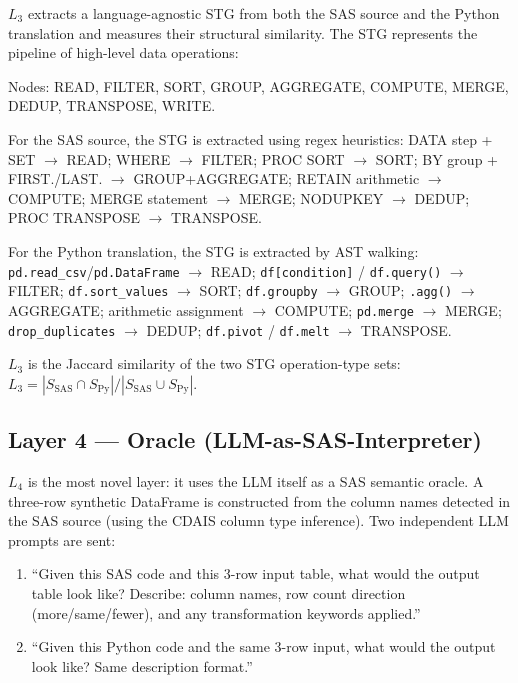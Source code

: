 $L_3$ extracts a language-agnostic \ac{STG} from both the SAS source and the
Python translation and measures their structural similarity. The STG represents
the pipeline of high-level data operations:

Nodes: READ, FILTER, SORT, GROUP, AGGREGATE, COMPUTE, MERGE, DEDUP, TRANSPOSE,
WRITE.

For the SAS source, the STG is extracted using regex heuristics: DATA step +
SET $\rightarrow$ READ; WHERE $\rightarrow$ FILTER; PROC SORT $\rightarrow$ SORT;
BY group + FIRST./LAST. $\rightarrow$ GROUP+AGGREGATE; RETAIN arithmetic
$\rightarrow$ COMPUTE; MERGE statement $\rightarrow$ MERGE;
NODUPKEY $\rightarrow$ DEDUP; PROC TRANSPOSE $\rightarrow$ TRANSPOSE.

For the Python translation, the STG is extracted by AST walking:
\texttt{pd.read\_csv}/\texttt{pd.DataFrame} $\rightarrow$ READ;
\texttt{df[condition]} / \texttt{df.query()} $\rightarrow$ FILTER;
\texttt{df.sort\_values} $\rightarrow$ SORT; \texttt{df.groupby} $\rightarrow$
GROUP; \texttt{.agg()} $\rightarrow$ AGGREGATE; arithmetic assignment
$\rightarrow$ COMPUTE; \texttt{pd.merge} $\rightarrow$ MERGE;
\texttt{drop\_duplicates} $\rightarrow$ DEDUP; \texttt{df.pivot} /
\texttt{df.melt} $\rightarrow$ TRANSPOSE.

$L_3$ is the Jaccard similarity of the two STG operation-type sets:
$L_3 = |S_{\text{SAS}} \cap S_{\text{Py}}| / |S_{\text{SAS}} \cup S_{\text{Py}}|$.

\subsection{Layer 4 --- Oracle (LLM-as-SAS-Interpreter)}
\label{subsec:sc-l4}

$L_4$ is the most novel layer: it uses the LLM itself as a SAS semantic oracle.
A three-row synthetic DataFrame is constructed from the column names detected
in the SAS source (using the CDAIS column type inference). Two independent LLM
prompts are sent:

\begin{enumerate}
  \item ``Given this SAS code and this 3-row input table, what would the output
    table look like? Describe: column names, row count direction (more/same/fewer),
    and any transformation keywords applied.''
  \item ``Given this Python code and the same 3-row input, what would the output
    look like? Same description format.''
\end{enumerate}

